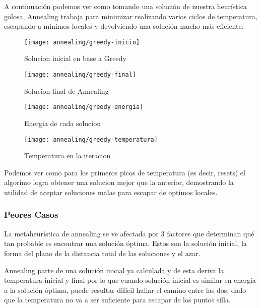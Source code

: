 A continuación podemos ver como tomando una solución de nuestra heurística golosa, Annealing trabaja para minimizar realizando varios ciclos de temperatura, escapando a mínimos locales y devolviendo una solución mucho más eficiente.

\begin{figure}[H]
	\centering
	\begin{minipage}[t]{.45\textwidth}
		\centering
		\texttt{[image: annealing/greedy-inicio]}
		\caption{Solucion inicial en base a Greedy}
	\end{minipage}\qquad
	\begin{minipage}[t]{.45\textwidth}
		\centering
		\texttt{[image: annealing/greedy-final]}
		\caption{Solucion final de Annealing}
	\end{minipage}
	
		\centering
	\begin{minipage}[t]{.45\textwidth}
		\centering
		\texttt{[image: annealing/greedy-energia]}
		\caption{Energia de cada solucion}
	\end{minipage}\qquad
	\begin{minipage}[t]{.45\textwidth}
		\centering
		\texttt{[image: annealing/greedy-temperatura]}
		\caption{Temperatura en la iteracion}
	\end{minipage}
\end{figure}	

Podemos ver como para los primeros picos de temperatura (es decir, resets) el algorimo logra obtener una solucion mejor que la anterior, demostrando la utilidad de aceptar soluciones malas para escapar de optimos locales.



\subsubsection{Peores Casos}

La metaheurística de annealing se ve afectada por 3 factores que determinan qué tan probable es encontrar una solución óptima. Estos son la solución inicial, la forma del plano de la distancia total de las soluciones y el azar.

Annealing parte de una solución inicial ya calculada y de esta deriva la temperatura inicial y final por lo que cuando solución inicial es similar en energía a la solución óptima, puede resultar difícil hallar el camino entre las dos, dado que la temperatura no va a ser suficiente para escapar de los puntos silla.

